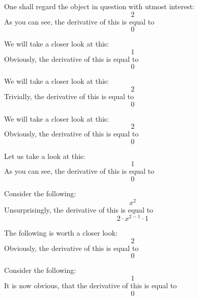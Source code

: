 \documentclass{article}
\begin{document}
One shall regard the object in question with utmost interest:
\begin{equation}
2 
\end{equation}
As you can see, the derivative of this is equal to
\begin{equation}
0 
\end{equation}

We will take a closer look at this:
\begin{equation}
1 
\end{equation}
Obviously, the derivative of this is equal to
\begin{equation}
0 
\end{equation}

We will take a closer look at this:
\begin{equation}
2 
\end{equation}
Trivially, the derivative of this is equal to
\begin{equation}
0 
\end{equation}

We will take a closer look at this:
\begin{equation}
2 
\end{equation}
Obviously, the derivative of this is equal to
\begin{equation}
0 
\end{equation}

Let us take a look at this:
\begin{equation}
1 
\end{equation}
As you can see, the derivative of this is equal to
\begin{equation}
0 
\end{equation}

Consider the following:
\begin{equation}
x ^{2 } 
\end{equation}
Unsurprisingly, the derivative of this is equal to
\begin{equation}
2 \cdot x ^{2 - 1 } \cdot 1 
\end{equation}

The following is worth a closer look:
\begin{equation}
2 
\end{equation}
Obviously, the derivative of this is equal to
\begin{equation}
0 
\end{equation}

Consider the following:
\begin{equation}
1 
\end{equation}
It is now obvious, that the derivative of this is equal to
\begin{equation}
0 
\end{equation}
\end{document}
